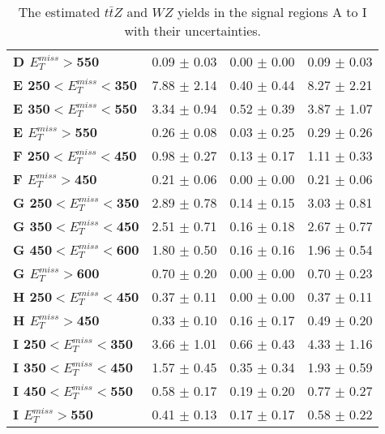 \begin{table}[h]
{\begin{tabular}{|l|ccc|}
\textbf{ D $E_T^{miss}>$550}     & 0.09 $\pm$ 0.03       & 0.00 $\pm$ 0.00       & 0.09 $\pm$ 0.03       \\
\textbf{ E 250$<E_T^{miss}<$350}         & 7.88 $\pm$ 2.14       & 0.40 $\pm$ 0.44       & 8.27 $\pm$ 2.21       \\
\textbf{ E 350$<E_T^{miss}<$550}         & 3.34 $\pm$ 0.94       & 0.52 $\pm$ 0.39       & 3.87 $\pm$ 1.07       \\
\textbf{ E $E_T^{miss}>$550}     & 0.26 $\pm$ 0.08       & 0.03 $\pm$ 0.25       & 0.29 $\pm$ 0.26       \\
\textbf{ F 250$<E_T^{miss}<$450}         & 0.98 $\pm$ 0.27       & 0.13 $\pm$ 0.17       & 1.11 $\pm$ 0.33       \\
\textbf{ F $E_T^{miss}>$450}     & 0.21 $\pm$ 0.06       & 0.00 $\pm$ 0.00       & 0.21 $\pm$ 0.06       \\
\textbf{ G 250$<E_T^{miss}<$350}         & 2.89 $\pm$ 0.78       & 0.14 $\pm$ 0.15       & 3.03 $\pm$ 0.81       \\
\textbf{ G 350$<E_T^{miss}<$450}         & 2.51 $\pm$ 0.71       & 0.16 $\pm$ 0.18       & 2.67 $\pm$ 0.77       \\
\textbf{ G 450$<E_T^{miss}<$600}         & 1.80 $\pm$ 0.50       & 0.16 $\pm$ 0.16       & 1.96 $\pm$ 0.54       \\
\textbf{ G $E_T^{miss}>$600}     & 0.70 $\pm$ 0.20       & 0.00 $\pm$ 0.00       & 0.70 $\pm$ 0.23       \\
\textbf{ H 250$<E_T^{miss}<$450}         & 0.37 $\pm$ 0.11       & 0.00 $\pm$ 0.00       & 0.37 $\pm$ 0.11       \\
\textbf{ H $E_T^{miss}>$450}     & 0.33 $\pm$ 0.10       & 0.16 $\pm$ 0.17       & 0.49 $\pm$ 0.20       \\
\hline
\textbf{ I 250$<E_T^{miss}<$350}         & 3.66 $\pm$ 1.01       & 0.66 $\pm$ 0.43       & 4.33 $\pm$ 1.16       \\
\textbf{ I 350$<E_T^{miss}<$450}         & 1.57 $\pm$ 0.45       & 0.35 $\pm$ 0.34       & 1.93 $\pm$ 0.59       \\
\textbf{ I 450$<E_T^{miss}<$550}         & 0.58 $\pm$ 0.17       & 0.19 $\pm$ 0.20       & 0.77 $\pm$ 0.27       \\
\textbf{ I $E_T^{miss}>$550}     & 0.41 $\pm$ 0.13       & 0.17 $\pm$ 0.17       & 0.58 $\pm$ 0.22       \\
\hline
\end{tabular}}
\caption[Table caption text]{The estimated $t\bar{t}Z$ and $WZ$ yields in the signal regions A to I with their uncertainties. }
\label{tab:YZnunu}
\end{table}

